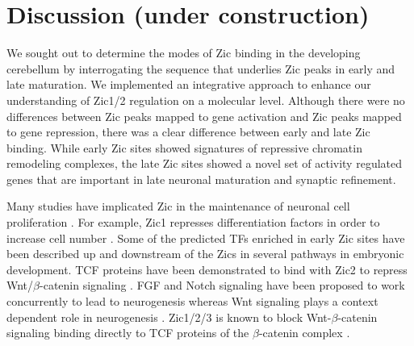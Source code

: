 \documentclass[fleqn,10pt]{wlscirep}
\begin{document}
\section*{Discussion (under construction)}
We sought out to determine the modes of Zic binding in the developing cerebellum by interrogating the sequence that underlies Zic peaks in early and late maturation. We implemented an integrative approach to enhance our understanding of Zic1/2 regulation on a molecular level. Although there were no differences between Zic peaks mapped to gene activation and Zic peaks mapped to gene repression, there was a clear difference between early and late Zic binding. While early Zic sites showed signatures of repressive chromatin remodeling complexes, the late Zic sites showed a novel set of activity regulated genes that are important in late neuronal maturation and synaptic refinement. 



Many studies have implicated Zic in the maintenance of neuronal cell proliferation \cite{ Lim2007Zic3Cells, Janesick2013ERFNeurogenesis, Aruga2002Zic1Differentiation, Ebert2003Zic1Autoregulation }. For example, Zic1 represses differentiation factors in order to increase cell number \cite{Aruga2002Zic1Differentiation}. Some of the predicted TFs enriched in early Zic sites have been described up and downstream of the Zics in several pathways in embryonic development. TCF proteins have been demonstrated to bind with Zic2 to repress  Wnt/$\beta$-catenin signaling \cite{Aruga2018Zic1, Lowenstein2021Olig3Development}. FGF and Notch signaling have been proposed to work concurrently to lead to neurogenesis \cite{Voelkel2014FGFHierarchy} whereas Wnt signaling plays a context dependent role in neurogenesis \cite{Lassiter2014SignalingDelamination}. Zic1/2/3 is known to block Wnt-$\beta$-catenin signaling binding directly to TCF proteins of the $\beta$-catenin complex \cite{Ge2020Zic1Transition, Fujimi2012XenopusPathway, Murgan2015AtypicalPrecursors, Pourebrahim2011TranscriptionSignaling, Aruga2018ZicDisease,Aruga2018Zic1,Lowenstein2021Olig3Development}.  
\end{document}
